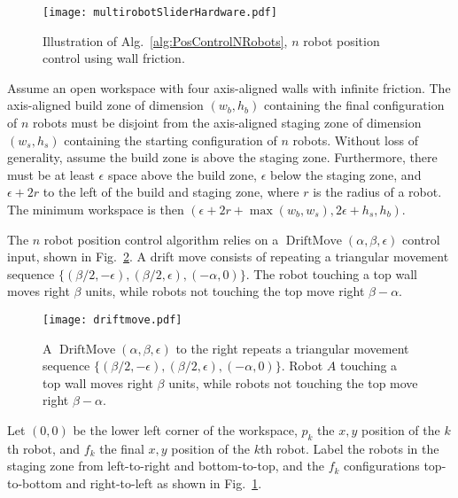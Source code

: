 \begin{figure}
\begin{center}
	\texttt{[image: multirobotSliderHardware.pdf]}
\end{center}
\vspace{-1em}
\caption{\label{fig:construction2d}
Illustration of Alg.\ \ref{alg:PosControlNRobots}, $n$ robot position control  using wall friction.
}
\end{figure}


Assume an open workspace with four axis-aligned walls with infinite friction.
The axis-aligned build zone of dimension $(w_b, h_b)$ containing the final configuration of $n$ robots must be disjoint from the axis-aligned staging zone of dimension $(w_s, h_s)$  containing the starting configuration of $n$ robots. Without loss of generality, assume the build zone  is above the staging zone. 
Furthermore, there must be at least $\epsilon$ space above the build zone, $\epsilon$ below the staging zone, and $\epsilon + 2r$ to the left of the build and staging zone, where $r$ is the radius of a robot.  The minimum workspace is then $(\epsilon + 2r + \max(w_b,w_s), 2\epsilon + h_s,h_b)$.

The $n$ robot position control algorithm relies on a $\operatorname{DriftMove}(\alpha, \beta, \epsilon)$ control input, shown in Fig.\  \ref{fig:driftmove}.
A drift move consists of repeating a triangular movement sequence $\{ (\beta/2,-\epsilon),(\beta/2,\epsilon),(-\alpha,0)\}$. The robot touching a top wall moves right $\beta$ units, while robots not touching the top move right $\beta-\alpha$.

\begin{figure}
\begin{center}
	\texttt{[image: driftmove.pdf]}
\end{center}
\vspace{-1em}
\caption{\label{fig:driftmove}
A  $\operatorname{DriftMove}(\alpha, \beta, \epsilon)$ to the right repeats a triangular movement sequence $\{ (\beta/2,-\epsilon),(\beta/2,\epsilon),(-\alpha,0)\}$. Robot $A$ touching a top wall moves right $\beta$ units, while robots not touching the top move right $\beta-\alpha$.}
\vspace{-1em}
\end{figure}

Let $(0,0)$ be the lower left corner of the workspace, $p_k$ the $x,y$ position of the $k$th robot, and $f_k$ the final $x,y$ position of the $k$th robot. Label the robots in the staging zone from left-to-right and bottom-to-top, and the $f_k$ configurations top-to-bottom and right-to-left as shown in Fig.~\ref{fig:construction2d}.

